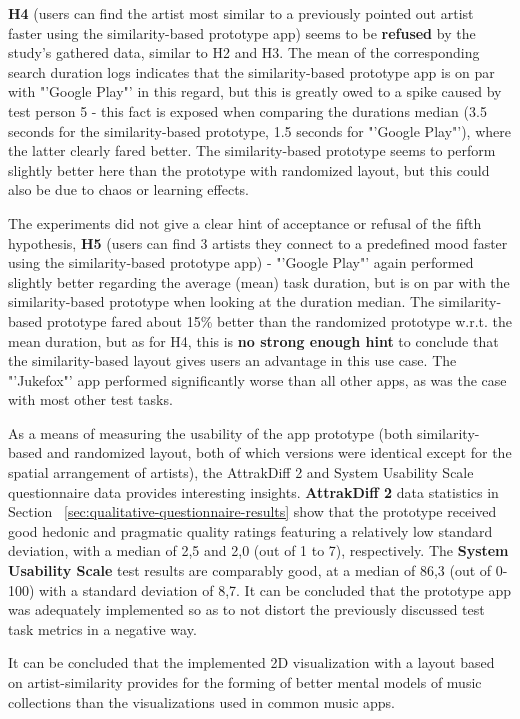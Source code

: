 \textbf{H4} (users can find the artist most similar to a previously pointed out artist faster using the similarity-based prototype app) seems to be \textbf{refused} by the study's gathered data, similar to H2 and H3. The mean of the corresponding search duration logs indicates that the similarity-based prototype app is on par with "'Google Play"' in this regard, but this is greatly owed to a spike caused by test person 5 - this fact is exposed when comparing the durations median (3.5 seconds for the similarity-based prototype, 1.5 seconds for "'Google Play"'), where the latter clearly fared better. The similarity-based prototype seems to perform slightly better here than the prototype with randomized layout, but this could also be due to chaos or learning effects.

The experiments did not give a clear hint of acceptance or refusal of the fifth hypothesis, \textbf{H5} (users can find 3 artists they connect to a predefined mood faster using the similarity-based prototype app) - "'Google Play"' again performed slightly better regarding the average (mean) task duration, but is on par with the similarity-based prototype when looking at the duration median. The similarity-based prototype fared about 15\% better than the randomized prototype w.r.t. the mean duration, but as for H4, this is \textbf{no strong enough hint} to conclude that the similarity-based layout gives users an advantage in this use case. The "'Jukefox"' app performed significantly worse than all other apps, as was the case with most other test tasks.

As a means of measuring the usability of the app prototype (both similarity-based and randomized layout, both of which versions were identical except for the spatial arrangement of artists), the AttrakDiff 2 and System Usability Scale questionnaire data provides interesting insights. \textbf{AttrakDiff 2} data statistics in Section ~\ref{sec:qualitative-questionnaire-results} show that the prototype received good hedonic and pragmatic quality ratings featuring a relatively low standard deviation, with a median of 2,5 and 2,0 (out of 1 to 7), respectively. The \textbf{System Usability Scale} test results are comparably good, at a median of 86,3 (out of 0-100) with a standard deviation of 8,7. It can be concluded that the prototype app was adequately implemented so as to not distort the previously discussed test task metrics in a negative way.

It can be concluded that the implemented 2D visualization with a layout based on artist-similarity provides for the forming of better mental models of music collections than the visualizations used in common music apps.

